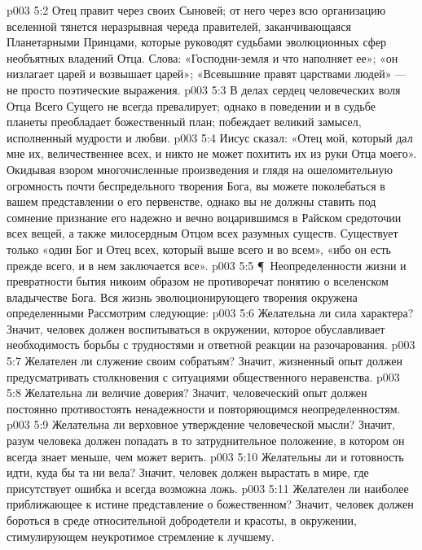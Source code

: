 \vs p003 5:2 Отец правит через своих Сыновей; от него через всю организацию вселенной тянется неразрывная череда правителей, заканчивающаяся Планетарными Принцами, которые руководят судьбами эволюционных сфер необъятных владений Отца. Слова: «Господни\hyp{}земля и что наполняет ее»; «он низлагает царей и возвышает царей»; «Всевышние правят царствами людей» --- не просто поэтические выражения.
\vs p003 5:3 В делах сердец человеческих воля Отца Всего Сущего не всегда превалирует; однако в поведении и в судьбе планеты преобладает божественный план; побеждает великий замысел, исполненный мудрости и любви.
\vs p003 5:4 Иисус сказал: «Отец мой, который дал мне их, величественнее всех, и никто не может похитить их из руки Отца моего». Окидывая взором многочисленные произведения и глядя на ошеломительную огромность почти беспредельного творения Бога, вы можете поколебаться в вашем представлении о его первенстве, однако вы не должны ставить под сомнение признание его надежно и вечно воцарившимся в Райском средоточии всех вещей, а также милосердным Отцом всех разумных существ. Существует только «один Бог и Отец всех, который выше всего и во всем», «ибо он есть прежде всего, и в нем заключается все».
\vs p003 5:5 \P\ Неопределенности жизни и превратности бытия никоим образом не противоречат понятию о вселенском владычестве Бога. Вся жизнь эволюционирующего творения окружена определенными  Рассмотрим следующие:
\vs p003 5:6 \bibnobreakspace Желательна ли  сила характера? Значит, человек должен воспитываться в окружении, которое обуславливает необходимость борьбы с трудностями и ответной реакции на разочарования.
\vs p003 5:7 \bibnobreakspace Желателен ли  служение своим собратьям? Значит, жизненный опыт должен предусматривать столкновения с ситуациями общественного неравенства.
\vs p003 5:8 \bibnobreakspace Желательна ли  величие доверия? Значит, человеческий опыт должен постоянно противостоять ненадежности и повторяющимся неопределенностям.
\vs p003 5:9 \bibnobreakspace Желательна ли  верховное утверждение человеческой мысли? Значит, разум человека должен попадать в то затруднительное положение, в котором он всегда знает меньше, чем может верить.
\vs p003 5:10 \bibnobreakspace Желательны ли  и готовность идти, куда бы та ни вела? Значит, человек должен вырастать в мире, где присутствует ошибка и всегда возможна ложь.
\vs p003 5:11 \bibnobreakspace Желателен ли  наиболее приближающее к истине представление о божественном? Значит, человек должен бороться в среде относительной добродетели и красоты, в окружении, стимулирующем неукротимое стремление к лучшему.
